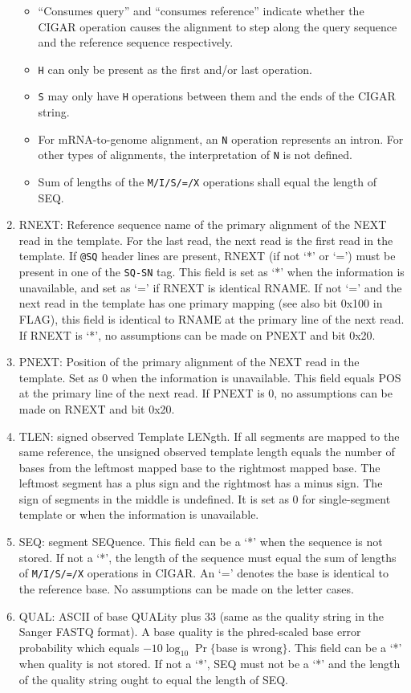 \documentclass[10pt]{article}
\begin{document}
\begin{enumerate}
\begin{itemize}
  \item ``Consumes query'' and ``consumes reference'' indicate
    whether the CIGAR operation causes the alignment to step along the
    query sequence and the reference sequence respectively.
  \item {\tt H} can only be present as the first and/or last operation.
  \item {\tt S} may only have {\tt H} operations between them and the
    ends of the {\sf CIGAR} string.
  \item For mRNA-to-genome alignment, an {\tt N} operation represents an
    intron. For other types of alignments, the interpretation of {\tt N}
    is not defined.
  \item Sum of lengths of the {\tt M/I/S/=/X} operations shall equal
    the length of {\sf SEQ}.
  \end{itemize}
\item {\sf RNEXT}: Reference sequence name of the primary alignment of the NEXT read in the
  template. For the last read, the next read is the first
  read in the template. If {\tt @SQ} header lines are present, {\sf
    RNEXT} (if not `*' or `=') must be present in one of the {\tt SQ-SN}
  tag. This field is set as `*' when the information is unavailable, and
  set as `=' if {\sf RNEXT} is identical {\sf RNAME}. If not `=' and the
  next read in the template has one primary mapping (see also bit
  0x100 in {\sf FLAG}), this field is identical to {\sf RNAME} at the primary line of the
  next read.  If {\sf
    RNEXT} is `*', no assumptions can be made on {\sf PNEXT} and bit
  0x20.
\item {\sf PNEXT}: Position of the primary alignment of the NEXT read in the template. Set as
  0 when the information is unavailable. This field equals {\sf POS} at the primary line of
  the next read. If {\sf PNEXT} is 0, no assumptions can be made on
  {\sf RNEXT} and bit 0x20.
\item {\sf TLEN}: signed observed Template LENgth. If all segments are
  mapped to the same reference, the unsigned observed template length
  equals the number of bases from the leftmost mapped base to the
  rightmost mapped base. The leftmost segment has a plus sign and the
  rightmost has a minus sign. The sign of segments in the middle is
  undefined. It is set as 0 for single-segment template or when the
  information is unavailable.
\item {\sf SEQ}: segment SEQuence. This field can be a `*' when the
  sequence is not stored. If not a `*', the length of the sequence must
  equal the sum of lengths of {\tt M/I/S/=/X} operations in {\sf CIGAR}.
  An `=' denotes the base is identical to the reference base. No
  assumptions can be made on the letter cases.
\item {\sf QUAL}: ASCII of base QUALity plus 33 (same as the quality
  string in the Sanger FASTQ format). A base quality is the phred-scaled
  base error probability which equals $-10\log_{10}\Pr\{\mbox{base is
    wrong}\}$. This field can be a `*' when quality is not stored. If
  not a `*', {\sf SEQ} must not be a `*' and the length of the quality string
  ought to equal the length of {\sf SEQ}.
\end{enumerate}
\end{document}
